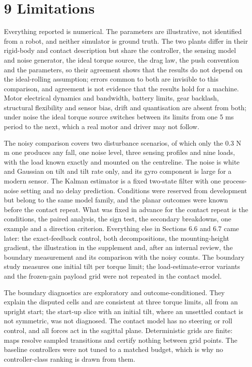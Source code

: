 \documentclass[11pt,a4paper]{article}
\begin{document}
\section*{9 Limitations}
Everything reported is numerical. The parameters are illustrative, not identified from a robot, and neither simulator is ground truth. The two plants differ in their rigid-body and contact description but share the controller, the sensing model and noise generator, the ideal torque source, the drag law, the push convention and the parameters, so their agreement shows that the results do not depend on the ideal-rolling assumption; errors common to both are invisible to this comparison, and agreement is not evidence that the results hold for a machine. Motor electrical dynamics and bandwidth, battery limits, gear backlash, structural flexibility and sensor bias, drift and quantisation are absent from both; under noise the ideal torque source switches between its limits from one 5 ms period to the next, which a real motor and driver may not follow.

The noisy comparison covers two disturbance scenarios, of which only the 0.3 N m one produces any fall, one noise level, three sensing profiles and nine loads, with the load known exactly and mounted on the centreline. The noise is white and Gaussian on tilt and tilt rate only, and its gyro component is large for a modern sensor. The Kalman estimator is a fixed two-state filter with one process-noise setting and no delay prediction. Conditions were reserved from development but belong to the same model family, and the planar outcomes were known before the contact repeat. What was fixed in advance for the contact repeat is the conditions, the paired analysis, the sign test, the secondary breakdowns, one example and a direction criterion. Everything else in Sections 6.6 and 6.7 came later: the exact-feedback control, both decompositions, the mounting-height gradient, the illustration in the supplement and, after an internal review, the boundary measurement and its comparison with the noisy counts. The boundary study measures one initial tilt per torque limit; the load-estimate-error variants and the frozen-gain payload grid were not repeated in the contact model.

The boundary diagnostics are exploratory and outcome-conditioned. They explain the disputed cells and are consistent at three torque limits, all from an upright start; the start-up slice with an initial tilt, where an unsettled contact is not symmetric, was not diagnosed. The contact model has no steering or roll control, and all forces act in the sagittal plane. Deterministic grids are finite: maps resolve sampled transitions and certify nothing between grid points. The baseline controllers were not tuned to a matched budget, which is why no controller-class ranking is drawn from them.
\end{document}

